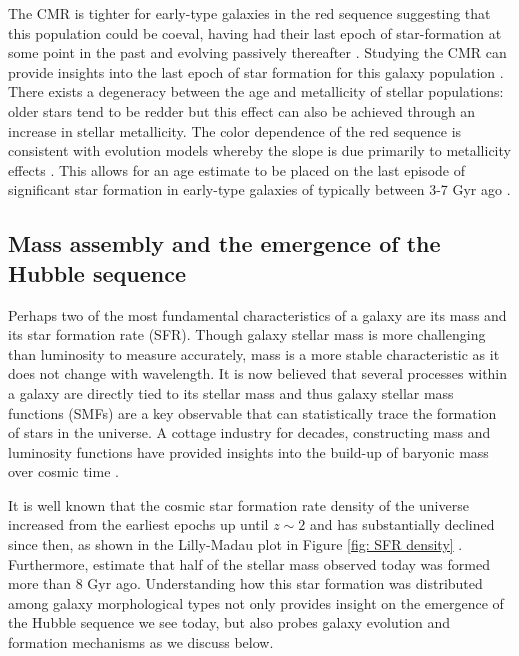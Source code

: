 The CMR is tighter for early-type galaxies in the red sequence suggesting that this population could be coeval, having had their last epoch of star-formation at some point in the past and evolving passively thereafter \citep{Bower1992}. Studying the CMR can provide insights into the last epoch of star formation for this galaxy population \citep{Sandage1978, Tully1982}. There exists a degeneracy between the age and metallicity of stellar populations: older stars tend to be redder but this effect can also be achieved through an increase in stellar metallicity. The color dependence of the red sequence is consistent with evolution models whereby the slope is due primarily to metallicity effects \citep{Bower1992, Kodama1997}. This allows for an age estimate to be placed on the last episode of significant star formation in early-type galaxies of typically between 3-7 Gyr ago \citep[e.g.,][]{LopezCruz2004}.%



\subsection{Mass assembly and the emergence of the Hubble sequence}
\label{sec: mass assembly}

Perhaps two of the most fundamental characteristics of a galaxy are its mass and its star formation rate (SFR). Though galaxy stellar mass is more challenging than luminosity to measure accurately, mass is a more stable characteristic as it does not change with wavelength. It is now believed that several processes within a galaxy are directly tied to its stellar mass and thus galaxy stellar mass functions (SMFs) are a key observable that can statistically trace the formation of stars in the universe.  A cottage industry for decades, constructing mass and luminosity functions have provided insights into the build-up of baryonic mass over cosmic time \citep{Steidel1999,Ouchi2004,Giavalisco2004,Drory2005,Fontana2006,Marchesini2009,Caputi2011,Gonzalez2011,Lee2012,Ilbert2013,Bernardi2013,Duncan2014}. 


It is well known that the cosmic star formation rate density of the universe increased from the earliest epochs up until $z\sim2$ and has substantially declined since then, as shown in the Lilly-Madau plot in Figure \ref{fig: SFR density} \citep[and references therein]{Madau2014}. Furthermore, \cite{Madau2014} estimate that half of the stellar mass observed today was formed more than 8 Gyr ago. Understanding how this star formation was distributed among galaxy morphological types not only provides insight on the emergence of the Hubble sequence we see today, but also probes galaxy evolution and formation mechanisms as we discuss below.

